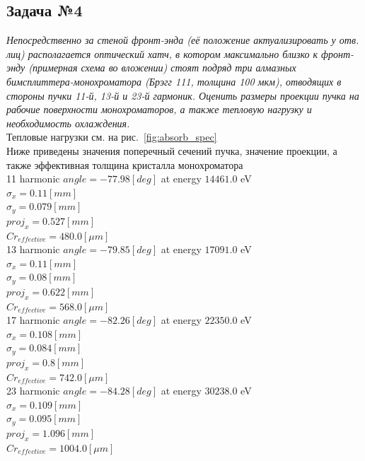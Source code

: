 \documentclass[14pt,a4paper]{extarticle}
\numberwithin{equation}{section}
\begin{document}
\subsection{Задача №4}
\textit{Непосредственно за стеной фронт-энда (её положение актуализировать у отв. лиц) располагается оптический хатч, в котором максимально близко к фронт-энду (примерная схема во вложении) стоят подряд три алмазных бимсплиттера-монохроматора (Брэгг 111, толщина 100 мкм), отводящих в стороны пучки 11-й, 13-й и 23-й гармоник. Оценить размеры проекции пучка на рабочие поверхности монохроматоров, а также тепловую нагрузку и необходимость охлаждения.}\\
Тепловые нагрузки см. на рис.~\ref{fig:absorb_spec}\\
Ниже приведены значения поперечный сечений пучка, значение проекции, а также эффективная толщина кристалла монохроматора\\
11 harmonic  $angle =  -77.98 [deg]$ at energy $14461.0$ eV\\ 
$\sigma_x =  0.11 [mm]$\\ 
$\sigma_y =  0.079 [mm]$\\ 
$proj_x  =  0.527 [mm]$\\ 
$Cr_{effective}  =  480.0 [\mu m]$\\
13 harmonic  $angle =  -79.85 [deg]$ at energy $17091.0$ eV\\ 
$\sigma_x =  0.11 [mm]$\\ 
$\sigma_y =  0.08 [mm]$\\ 
$proj_x  =  0.622 [mm]$\\ 
$Cr_{effective}  =  568.0 [\mu m]$\\
17 harmonic  $angle =  -82.26 [deg]$ at energy $22350.0$ eV\\ 
$\sigma_x =  0.108 [mm]$\\ 
$\sigma_y =  0.084 [mm]$\\ 
$proj_x  =  0.8 [mm]$\\ 
$Cr_{effective}  =  742.0 [\mu m]$\\
23 harmonic  $angle =  -84.28 [deg]$ at energy $30238.0$ eV\\ 
$\sigma_x =  0.109 [mm]$\\ 
$\sigma_y =  0.095 [mm]$\\ 
$proj_x  =  1.096 [mm]$\\ 
$Cr_{effective}  =  1004.0 [\mu m]$\\
\end{document}
